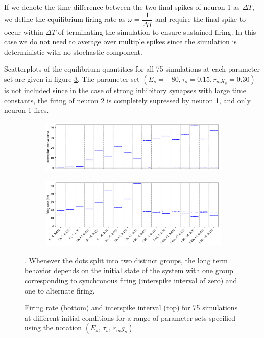 \documentclass{article}
\begin{document}
If we denote the time difference between the two final spikes of neuron 1 as $\Delta T$, we define the equilibrium firing rate as $\omega = \dfrac{1}{\Delta T}$ and require the final spike to occur within $\Delta T$ of terminating the simulation to ensure sustained firing.
In this case we do not need to average over multiple spikes since the simulation is deterministic with no stochastic component.

Scatterplots of the equilibrium quantities for all 75 simulations at each parameter set are given in figure \ref{fig:scat}. The parameter set $(E_s = -80, \tau_s = 0.15, r_m \bar g_s = 0.30)$ is not included since in the case of strong inhibitory synapses with large time constants, the firing of neuron 2 is completely supressed by neuron 1, and only neuron 1 fires.

\begin{figure}[h]
	\centering
	\begin{subfigure}[t]{0.8\linewidth}
		\centering
		\includegraphics[width = 1.0\linewidth, trim={0 7 0 0}, clip=true]{ints_scatter.png}
		\label{fig:int}	
	\end{subfigure}%
	\hspace{0.001\linewidth}
	\begin{subfigure}[t]{0.8\linewidth}
		\centering
		\includegraphics[width = 1.0\linewidth, trim={0 0 0 7}, clip=true]{rates_scatter.png}
		\label{fig:rate}	
	\end{subfigure}%
\label{fig:scat}
\caption{Firing rate (bottom) and interspike interval (top) for 75 simulations at different initial conditions for a range of parameter sets specified using the notation $(E_s, \, \tau_s, \, r_m \bar g_s)$}. Whenever the dots split into two distinct groups, the long term behavior depends on the initial state of the system with one group corresponding to synchronous firing (interspike interval of zero) and one to alternate firing.
\end{figure}
\end{document}
